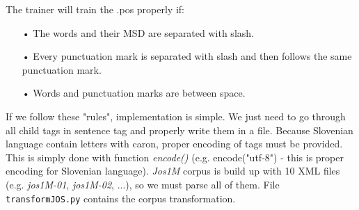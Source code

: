 \documentclass[10pt, conference, compsocconf]{IEEEtran}
\begin{document}
The trainer will train the .pos properly if:
\begin{itemize}
\item[•] The words and their MSD are separated with slash.
\item[•] Every punctuation mark is separated with slash and then follows the same punctuation mark.
\item[•] Words and punctuation marks are between space.
\end{itemize}

If we follow these "rules", implementation is simple. We just need to go through all child tags in sentence tag and properly write them in a file. Because Slovenian language contain letters with caron, proper encoding of tags must be provided. This is simply done with function \textit{encode()} (e.g. encode("utf-8") - this is proper encoding for Slovenian language).
\textit{Jos1M} corpus is build up with 10 XML files (e.g. \textit{jos1M-01}, \textit{jos1M-02}, ...), so we must parse all of them. 
File \texttt{transformJOS.py} contains the corpus transformation.
\end{document}
